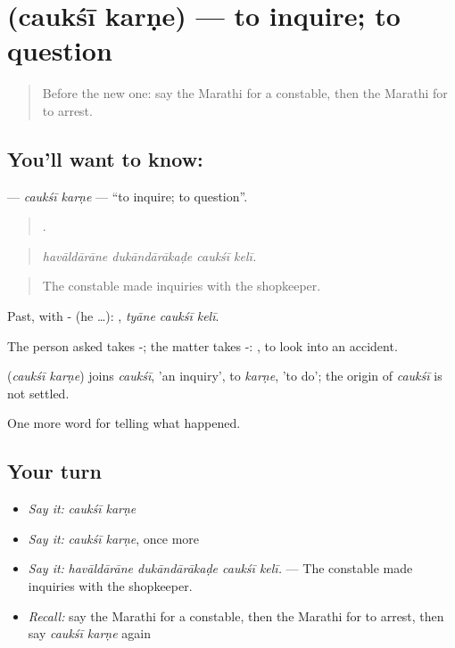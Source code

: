 \section[\texorpdfstring{\mr{चौकशी} \mr{करणे} (caukśī karṇe)}{चौकशी करणे (caukśī karṇe)}]{  (caukśī karṇe) — to inquire; to question}

\label{lesson:MR-C290-cauksi-karne}



\begin{quote}
Before the new one: say the Marathi for a constable, then the Marathi for to arrest.
\end{quote}

\subsection*{You'll want to know:  }
\textbf{ } — \emph{caukśī karṇe} — \textquotedblleft{}to inquire; to question\textquotedblright{}.

\begin{quote}
   .
\end{quote}

\begin{quote}
\emph{havāldārāne dukāndārākaḍe caukśī kelī.}
\end{quote}

\begin{quote}
The constable made inquiries with the shopkeeper.
\end{quote}

Past, with - (he …):   , \emph{tyāne caukśī kelī}.

The person asked takes -; the matter takes -:   , to look into an accident.

\begin{cousinweb}
\textbf{ } (\emph{caukśī karṇe}) joins \emph{caukśī}, 'an inquiry', to \emph{karṇe}, 'to do'; the origin of \emph{caukśī} is not settled.
\end{cousinweb}

\begin{grammarlens}[title={What you've built}]
One more word for telling what happened.
\end{grammarlens}

\subsection*{Your turn}
\begin{itemize}
\raggedright
  \item \emph{Say it:} \emph{caukśī karṇe}
  \item \emph{Say it:} \emph{caukśī karṇe}, once more
  \item \emph{Say it:} \emph{havāldārāne dukāndārākaḍe caukśī kelī.} — The constable made inquiries with the shopkeeper.
  \item \emph{Recall:} say the Marathi for a constable, then the Marathi for to arrest, then say \emph{caukśī karṇe} again
\end{itemize}

